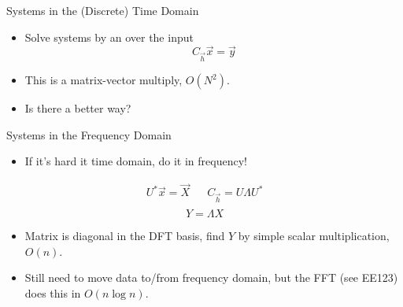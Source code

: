 \begin{frame}{Systems in the (Discrete) Time Domain}
  \begin{itemize}
    \item Solve systems by  an  over the input
    \begin{equation*}
      C_{\vec{h}} \vec{x} = \vec{y}
    \end{equation*}
  \item This is a matrix-vector multiply, $O(N^2)$.
  \item Is there a better way?
  \end{itemize}
\end{frame}

\begin{frame}{Systems in the Frequency Domain}
  \begin{itemize}
    \item If it's hard it time domain, do it in frequency!
  \end{itemize}

  \begin{center}
  \end{center}

  \begin{align*}
    U^*\vec{x} = \vec{X} && C_{\vec{h}} = U \Lambda U^* \\
  \end{align*}
  \begin{equation*}
    Y = \Lambda X
  \end{equation*}
  \begin{itemize}
    \item Matrix is diagonal in the DFT basis, find $Y$ by simple scalar multiplication, $O(n)$.
    \item Still need to move data to/from frequency domain, but the FFT (see EE123) does this in $O(n \log n)$.
  \end{itemize}
\end{frame}

